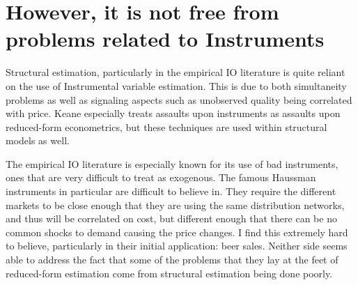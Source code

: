 \documentclass[12pt, letterpaper]{paper}
\begin{document}
\section{However, it is not free from problems related to Instruments}
\label{sec:orgfb386d8}
Structural estimation, particularly in the empirical IO literature is
quite reliant on the use of Instrumental variable estimation. This is
due to both simultaneity problems as well as signaling aspects such
as unobserved quality being correlated with price. Keane especially
treats assaults upon instruments as assaults upon reduced-form
econometrics, but these techniques are used within structural models
as well. 

The empirical IO literature is especially known for its use of bad
instruments, ones that are very difficult to treat as exogenous. The
famous Haussman instruments in particular are difficult to believe
in. They require the different markets to be close enough that they
are using the same distribution networks, and thus will be correlated
on cost, but different enough that there can be no common shocks to
demand causing the price changes. I find this extremely hard to
believe, particularly in their initial application: beer
sales. Neither side seems able to address the fact that some of the
problems that they lay at the feet of reduced-form estimation come
from structural estimation being done poorly.
\end{document}
